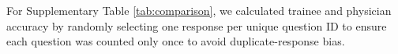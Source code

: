 \documentclass[11pt]{article}
\begin{document}


For Supplementary Table \ref{tab:comparison}, we calculated trainee and physician accuracy by randomly selecting one response per unique question ID to ensure each question was counted only once to avoid duplicate-response bias.
\end{document}
